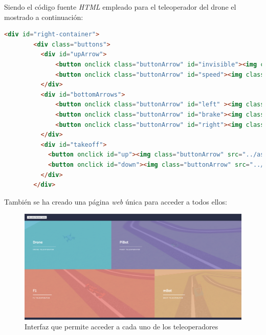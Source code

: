 Siendo el código fuente \textit{HTML} empleado para el teleoperador del drone el mostrado a continuación: 

\begin{lstlisting}[language=html,label=lst:teleop,caption=Código HTML del teleoperador del drone]
      <div id="right-container">
        <div class="buttons">
          <div id="upArrow">
              <button onclick class="buttonArrow" id="invisible"><img class="buttonArrow" src="../assets/resources/speed.svg" /></button>
              <button onclick class="buttonArrow" id="speed"><img class="buttonArrow" src="../assets/resources/speed.svg" /></button>
          </div>
          <div id="bottomArrows">
              <button onclick class="buttonArrow" id="left" ><img class="buttonArrow" src="../assets/resources/left.svg"/></button>
              <button onclick class="buttonArrow" id="brake"><img class="buttonArrow" src="../assets/resources/brake.svg"/></button>
              <button onclick class="buttonArrow" id="right"><img class="buttonArrow" src="../assets/resources/right.svg"/></button><br>
          </div>
          <div id="takeoff">
            <button onclick id="up"><img class="buttonArrow" src="../assets/resources/goUp.svg" /></button>
            <button onclick id="down"><img class="buttonArrow" src="../assets/resources/goDown.svg" /></button></button>
          </div>
        </div>
\end{lstlisting}

También se ha creado una página \textit{web}  única para acceder a todos ellos: 

 \begin{figure}[H]
    \centering
    \includegraphics[scale=0.25]{img/teleoperators.png}
    \caption{Interfaz que permite acceder a cada uno de los teleoperadores} \label{fig:teleoperators}
\end{figure}

